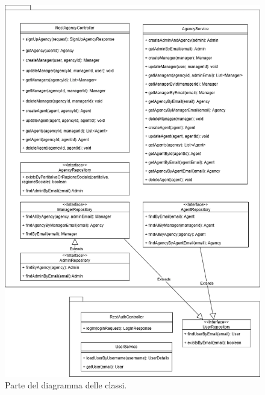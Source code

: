 \begin{figure}[h]
    \centering
    \includegraphics[width=\textwidth]{assets/diagrams/class-diagram/class-diagram-1.png}
    \caption{Parte del diagramma delle classi.}
    \label{fig:Parte 1 del diagramma delle classi}
\end{figure}

